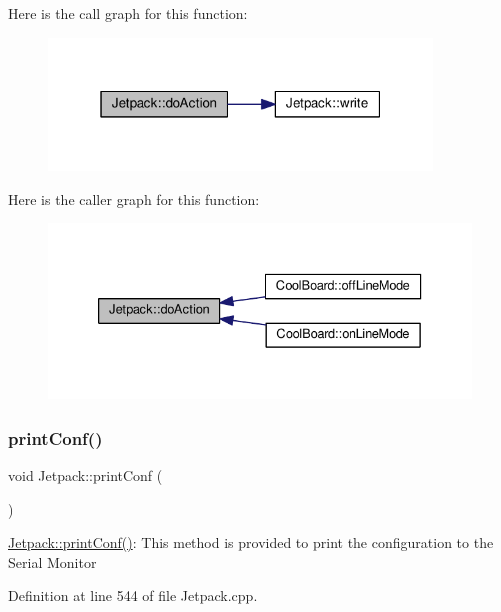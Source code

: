 Here is the call graph for this function\+:\nopagebreak
\begin{figure}[H]
\begin{center}
\leavevmode
\includegraphics[width=289pt]{classJetpack_a86d2e83436ef4b85f4c3a6e85ac785b0_cgraph}
\end{center}
\end{figure}
Here is the caller graph for this function\+:\nopagebreak
\begin{figure}[H]
\begin{center}
\leavevmode
\includegraphics[width=333pt]{classJetpack_a86d2e83436ef4b85f4c3a6e85ac785b0_icgraph}
\end{center}
\end{figure}
\mbox{\label{classJetpack_ac54a7bb4f9166bee32052253d9b1d306}} 
\subsubsection{\texorpdfstring{print\+Conf()}{printConf()}}
{\footnotesize\ttfamily void Jetpack\+::print\+Conf (\begin{DoxyParamCaption}{ }\end{DoxyParamCaption})}

\hyperlink{classJetpack_ac54a7bb4f9166bee32052253d9b1d306}{Jetpack\+::print\+Conf()}\+: This method is provided to print the configuration to the Serial Monitor 

Definition at line 544 of file Jetpack.\+cpp.



